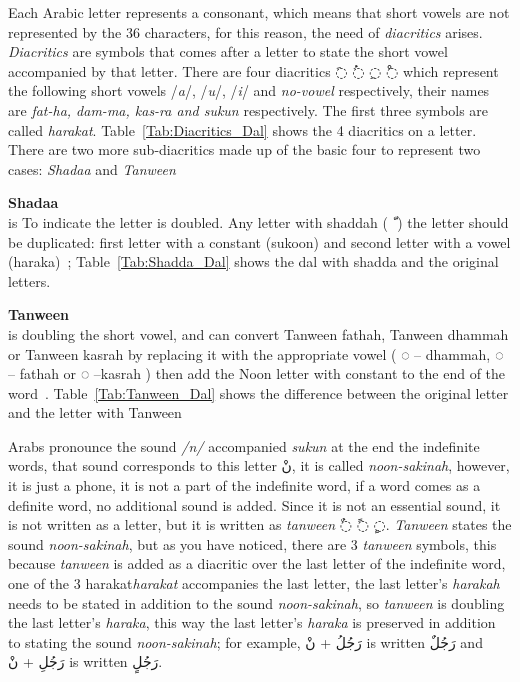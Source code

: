 Each Arabic letter represents a consonant, which means that short vowels are not
represented by the 36 characters, for this reason, the need of \textit{diacritics}
arises. \textit{Diacritics} are symbols that comes after a letter to state the
short vowel accompanied by that letter. There are four diacritics \textarabic{◌َ} \textarabic{◌ُ}
\textarabic{◌ِ} \textarabic{◌ْ} which represent the following short vowels
/\textit{a}/, /\textit{u}/, /\textit{i}/ and \textit{no-vowel} respectively,
their names are \textit{fat-ha, dam-ma, kas-ra and sukun} respectively.  The first
three symbols are called \textit{harakat}. Table~\ref{Tab:Diacritics_Dal}
shows the 4 diacritics on a letter.
There are two more sub-diacritics made up of the basic four to represent two
cases: \textit{Shadaa} and \textit{Tanween}
\begin{definition}\label{def:shadaa_definition}
\textbf{Shadaa}  \hfill \\
 is To indicate the letter is doubled. Any letter with shaddah (\textarabic{ ّ }) the letter should be duplicated: first letter with a constant (sukoon) and second letter with a vowel (haraka)~\cite{Alnagdawi2013}; Table~\ref{Tab:Shadda_Dal} shows the dal with shadda and the original letters.%
\end{definition}%
\begin{definition}\label{def:tanween_definition}
  \textbf{Tanween} \hfill \\
  is doubling the short vowel, and can convert
Tanween fathah, Tanween dhammah or Tanween kasrah by
replacing it with the appropriate vowel ( ُ◌ – dhammah, َ◌ –
fathah or ِ◌ –kasrah ) then add the Noon letter with constant to the end of the word~\cite{Alnagdawi2013}. Table~\ref{Tab:Tanween_Dal}
shows the difference between the original letter and the letter with Tanween%
\end{definition}%

Arabs pronounce the sound \textit{/n/} accompanied \textit{sukun} at the end the indefinite words, that sound corresponds to this
letter \textarabic{نْ}, it is called \textit{noon-sakinah}, however, it is
just a phone, it is not a part of the indefinite word, if a word comes as a
definite word, no additional sound is added. Since it is not an essential sound,
it is not written as a letter, but it is written as  \textit{tanween}
\textarabic{◌ٌ ◌ً ◌ٍ}.
\textit{Tanween} states the sound \textit{noon-sakinah}, but as you have noticed,
there are 3 \textit{tanween} symbols, this because  \textit{tanween} is added as
a diacritic over the last letter of the indefinite word, one of the 3 harakat\textit{harakat} accompanies the last letter, the last letter's \textit{harakah}
needs to be stated in addition to the sound \textit{noon-sakinah}, so
\textit{tanween} is doubling the last letter's \textit{haraka}, this way the last
letter's \textit{haraka} is preserved in addition to stating the sound
\textit{noon-sakinah}; for example, \textarabic{رَجُلُ + نْ} is written
\textarabic{رَجُلٌ} and  \textarabic{رَجُلِ + نْ} is written \textarabic{رَجُلٍ}.%

